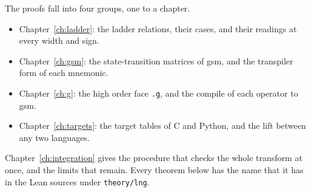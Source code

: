 The proofs fall into four groups, one to a chapter.
\begin{itemize}
  \item Chapter~\ref{ch:ladder}: the ladder relations, their cases, and their readings at every width and sign.
  \item Chapter~\ref{ch:gsm}: the state-transition matrices of gsm, and the transpiler form of each mnemonic.
  \item Chapter~\ref{ch:g}: the high order face \texttt{.g}, and the compile of each operator to gsm.
  \item Chapter~\ref{ch:targets}: the target tables of C and Python, and the lift between any two languages.
\end{itemize}
Chapter~\ref{ch:integration} gives the procedure that checks the whole transform at once, and the limits that
remain. Every theorem below has the name that it has in the Lean sources under \texttt{theory/lng}.
